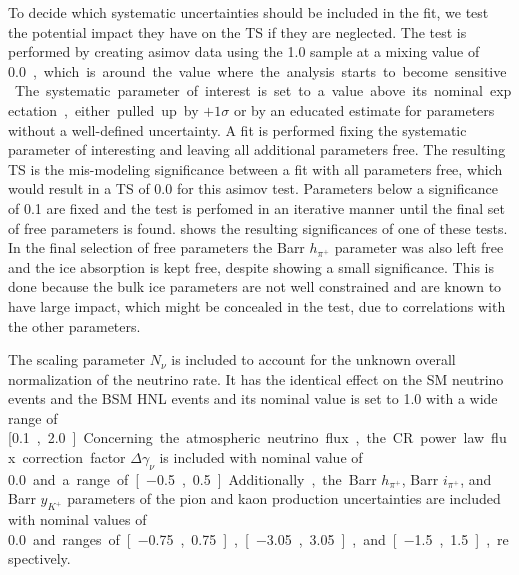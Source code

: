To decide which systematic uncertainties should be included in the fit, we test the potential impact they have on the TS if they are neglected. The test is performed by creating asimov data using the \SI{1.0}{\gev} sample at a mixing value of \SI{0.0}, which is around the value where the analysis starts to become sensitive. The systematic parameter of interest is set to a value above its nominal expectation, either pulled up by $+1\sigma$ or by an educated estimate for parameters without a well-defined uncertainty. A fit is performed fixing the systematic parameter of interesting and leaving all additional parameters free. The resulting TS is the mis-modeling significance between a fit with all parameters free, which would result in a TS of 0.0 for this asimov test. Parameters below a significance of \SI{0.1}{\sigma} are fixed and the test is perfomed in an iterative manner until the final set of free parameters is found.  shows the resulting significances of one of these tests. In the final selection of free parameters the Barr $h_{\pi^+}$ parameter was also left free and the ice absorption is kept free, despite showing a small significance. This is done because the bulk ice parameters are not well constrained and are known to have large impact, which might be concealed in the test, due to correlations with the other parameters.

The scaling parameter $N_{\nu}$ is included to account for the unknown overall normalization of the neutrino rate. It has the identical effect on the SM neutrino events and the BSM HNL events and its nominal value is set to 1.0 with a wide range of [\SI{0.1}, \SI{2.0}].

Concerning the atmospheric neutrino flux, the CR power law flux correction factor $\Delta \gamma_\nu$ is included with nominal value of \SI{0.0} and a range of [\SI{-0.5}, \SI{0.5}]. Additionally, the Barr $h_{\pi^+}$, Barr $i_{\pi^+}$, and Barr $y_{K^+}$ parameters of the pion and kaon production uncertainties are included with nominal values of \SI{0.0} and ranges of [\SI{-0.75}, \SI{0.75}], [\SI{-3.05}, \SI{3.05}], and [\SI{-1.5}, \SI{1.5}], respectively.

